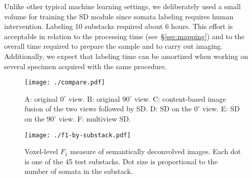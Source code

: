 \documentclass[smallextended]{svjour3}       %
\begin{document}
Unlike other typical machine learning settings, we deliberately used a
small volume for training the SD module since somata labeling requires
human intervention. Labeling 10 substacks required about 6 hours.
This effort is acceptable in relation to the processing time (see~\S\ref{sec:mapping}) and to the overall time required to prepare
the sample and to carry out imaging. Additionally, we expect that
labeling time can be amortized when working on several specimen
acquired with the same procedure.


\begin{figure*}
  \centering
  \texttt{[image: ./compare.pdf]}
  \caption{A: original $0^\circ$ view. B: original $90^\circ$ view. C:
    content-based image fusion of the two views followed by SD. D: SD on the $0^\circ$ view. E:
    SD on the $90^\circ$ view. F: multiview SD.}
  \label{fig:compare}
\end{figure*}

\begin{figure*}
  \centering
  \texttt{[image: ./f1-by-substack.pdf]}
  \caption{Voxel-level $F_1$ measure of semantically deconvolved images.
    Each dot is one of the 45 test substacks. Dot size is proportional to the
    number of somata in the substack.}
  \label{fig:f1-by-substack}
\end{figure*}

\end{document}
